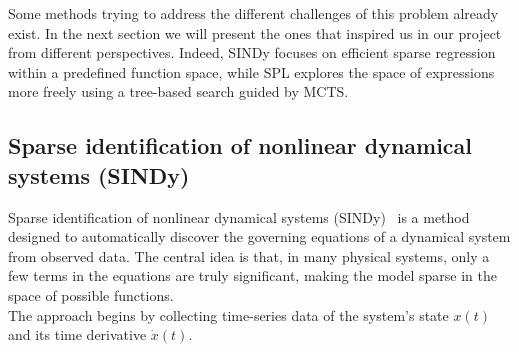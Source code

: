 \documentclass[11pt, a4paper]{article}
\begin{document}
Some methods trying to address the different challenges of this problem already exist. In the next section we will present the ones that inspired us in our project from different perspectives. Indeed, SINDy focuses on efficient sparse regression within a predefined function space, while SPL explores the space of expressions more freely using a tree-based search guided by MCTS.

\subsection{Sparse identification of nonlinear dynamical systems (SINDy)}

Sparse identification of nonlinear dynamical systems (SINDy)~\cite{brunton2016sindy} is a method designed to automatically discover the governing equations of a dynamical system from observed data. The central idea is that, in many physical systems, only a few terms in the equations are truly significant, making the model sparse in the space of possible functions.\\

The approach begins by collecting time-series data of the system's state $x(t)$ and its time derivative $\dot{x}(t)$. 
\end{document}
